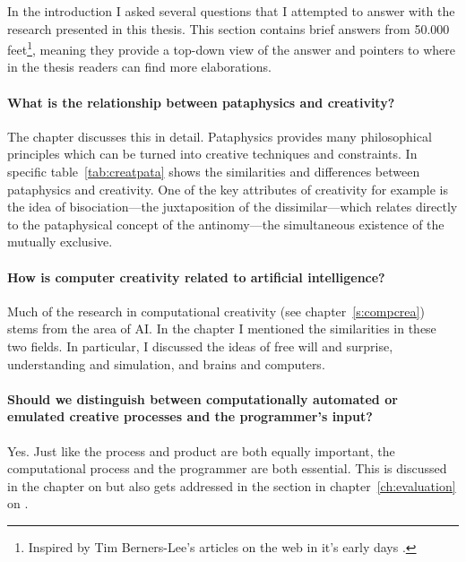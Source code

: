 In the introduction I asked several questions that I attempted to answer with the research presented in this thesis. This section contains brief answers from 50.000 feet\footnote{Inspired by Tim Berners-Lee's articles on the web in it's early days \autocite*{TBL1998}.}, meaning they provide a top-down view of the answer and pointers to where in the thesis readers can find more elaborations.

\paragraph{What is the relationship between pataphysics and creativity?}

The  chapter discusses this in detail. Pataphysics provides many philosophical principles which can be turned into creative techniques and constraints. In specific table~\ref{tab:creatpata} shows the similarities and differences between pataphysics and creativity. One of the key attributes of creativity for example is the idea of bisociation---the juxtaposition of the dissimilar---which relates directly to the pataphysical concept of the antinomy---the simultaneous existence of the mutually exclusive.

\paragraph{How is computer creativity related to artificial intelligence?}

Much of the research in computational creativity (see chapter~\ref{s:compcrea}) stems from the area of \ac{AI}. In the  chapter I mentioned the similarities in these two fields. In particular, I discussed the ideas of free will and surprise, understanding and simulation, and brains and computers.

\paragraph{Should we distinguish between computationally automated or emulated creative processes and the programmer's input?}

Yes. Just like the process and product are both equally important, the computational process and the programmer are both essential. This is discussed in the chapter on  but also gets addressed in the  section in chapter~\ref{ch:evaluation} on .

